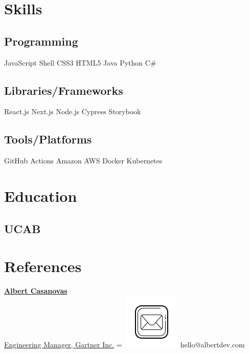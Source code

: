\documentclass[]{main}
\begin{document}
\begin{paracol}{2}
\switchcolumn[1]


\section{Skills}
\subsection{Programming}
\sectionsep
{}
JavaScript \textbullet{} Shell \textbullet{} CSS3 \textbullet{} HTML5
\sectionsep
{}
Java \textbullet{} Python \textbullet{} C#
\sectionsep
\sectionsep
\subsection{Libraries/Frameworks}
\sectionsep
React.js \textbullet{} Next.js \textbullet{} Node.js \textbullet{} Cypress \textbullet{} Storybook
\sectionsep
\sectionsep
\subsection{Tools/Platforms}
\sectionsep
GitHub Actions \textbullet{} Amazon AWS \textbullet{} Docker \textbullet{} Kubernetes

\sectionsep


\section{Education} 
\subsection{UCAB}
\sectionsep



\section{References} 
\href{https://www.linkedin.com/in/casanovasalbert/}{\textbf{Albert Casanovas} \\ Engineering Manager, Gartner Inc.}
\begingroup
{}=\hbox{
\includegraphics[scale=0.2,trim={1cm 1.2cm 1.2cm 0cm}]{images/icons/mail.png}\hspace{0.3cm} hello@albertdev.com
}
\parbox{\wd0}{}
\endgroup


\end{paracol}
\end{document}

